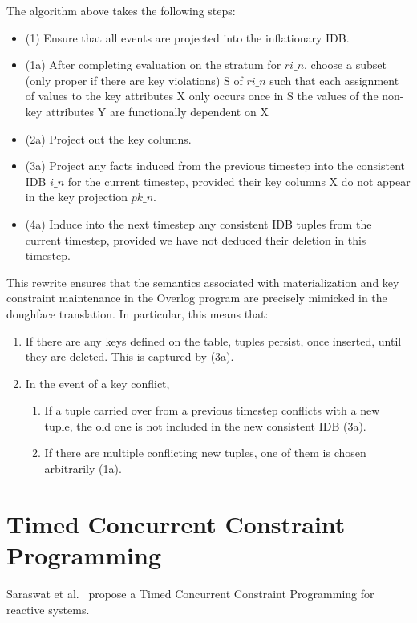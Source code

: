 The algorithm above takes the following steps:
\begin{itemize}
\item (1) Ensure that all events are projected into the inflationary IDB.
\item (1a) After completing evaluation on the stratum for $ri\_n$, choose a subset (only proper if there are key violations) S of $ri\_n$ such that
each assignment of values to the key attributes X only occurs once in S
the values of the non-key attributes Y are functionally dependent on X
\item (2a) Project out the key columns.
\item (3a) Project any facts induced from the previous timestep into the consistent IDB $i\_n$ for the current timestep, provided their key columns X do not appear in the key projection $pk\_n$.
\item (4a) Induce into the next timestep any consistent IDB tuples from the current timestep, provided we have not deduced their deletion in this timestep.
\end{itemize}

This rewrite ensures that the semantics associated with materialization and key constraint maintenance in the Overlog program are precisely mimicked in the doughface translation. In particular, this means that:

\begin{enumerate}
\item If there are any keys defined on the table, tuples persist, once inserted, until they are deleted. This is captured by (3a).
\item In the event of a key conflict,
\begin{enumerate}
	\item If a tuple carried over from a previous timestep conflicts with a new tuple, the old one is not included in the new consistent IDB (3a).
	\item If there are multiple conflicting new tuples, one of them is chosen arbitrarily (1a).
\end{enumerate}
\end{enumerate}

\section{Timed Concurrent Constraint Programming}

 
Saraswat et al.~\cite{tccp, tdccp} propose a Timed Concurrent Constraint Programming for reactive systems.


